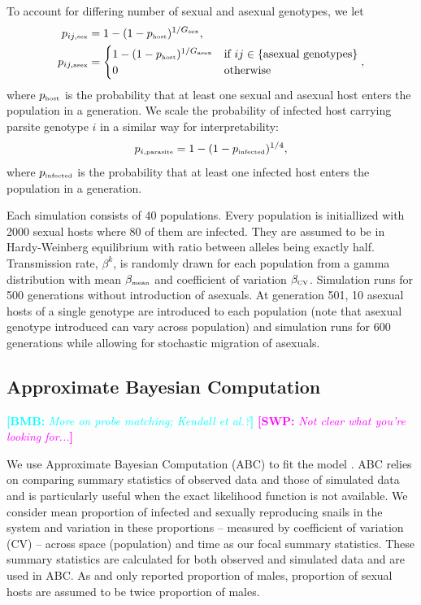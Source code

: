 \documentclass{article}\usepackage[]{graphicx}\usepackage[]{color}
\newcommand{\comment}[3]{\textcolor{#1}{\textbf{[#2: }\textit{#3}\textbf{]}}}
\newcommand{\bmb}[1]{\comment{cyan}{BMB}{#1}}
\newcommand{\swp}[1]{\comment{magenta}{SWP}{#1}}
\begin{document}
To account for differing number of sexual and asexual genotypes, we let 
\begin{equation}
\begin{aligned}
p_{ij, \textrm{\tiny sex}} &= 1-(1-p_{\textrm{\tiny host}})^{1/G_\textrm{\tiny sex}},\\
p_{ij, \textrm{\tiny asex}} &=
\begin{cases}
1-(1-p_{\textrm{\tiny host}})^{1/G_\textrm{\tiny asex}} & \text{if } ij \in \{\text{asexual genotypes}\} \\
0 & \text{otherwise}
\end{cases},
\end{aligned}
\end{equation}
where $p_{\textrm{\tiny host}}$ is the probability that at least one sexual and asexual host enters the population in a generation. We scale the probability of infected host carrying parsite genotype $i$ in a similar way for interpretability:
\begin{equation}
p_{i, \textrm{\tiny parasite}} = 1 - (1-p_{\textrm{\tiny infected}})^{1/4},
\end{equation}
where $p_{\textrm{\tiny infected}}$ is the probability that at least one infected host enters the population in a generation.

Each simulation consists of 40 populations. Every population is initiallized with 2000 sexual hosts where 80 of them are infected. They are assumed to be in Hardy-Weinberg equilibrium with ratio between alleles being exactly half. 
Transmission rate, $\beta^k$, is randomly drawn for each population from a gamma distribution with mean $\beta_{\textrm{\tiny mean}}$ and coefficient of variation $\beta_{\textrm{\tiny CV}}$. 
Simulation runs for 500 generations without introduction of asexuals. At generation 501, 10 asexual hosts of a single genotype are introduced to each population (note that asexual genotype introduced can vary across population) and simulation runs for 600 generations while allowing for stochastic migration of asexuals.

\subsection{Approximate Bayesian Computation}

\bmb{More on probe matching; Kendall et al.?}
\swp{Not clear what you're looking for...}

We use Approximate Bayesian Computation (ABC) to fit the model \citep{toni2009approximate}.
ABC relies on comparing summary statistics of observed data and those of simulated data and is particularly useful when the exact likelihood function is not available.
We consider mean proportion of infected and sexually reproducing snails in the system and variation in these proportions -- measured by coefficient of variation (CV) -- across space (population) and time as our focal summary statistics.
These summary statistics are calculated for both observed and simulated data and are used in ABC.
As \cite{dagan2013clonal} and \cite{mckone2016fine} only reported proportion of males, proportion of sexual hosts are assumed to be twice proportion of males.
\end{document}
